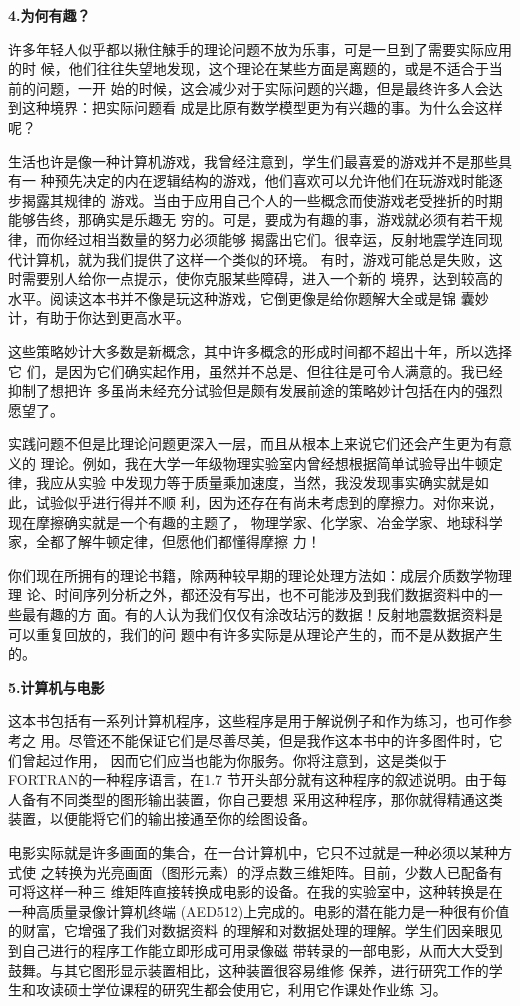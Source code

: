 \textbf{4.为何有趣？}


许多年轻人似乎都以揪住觫手的理论问题不放为乐事，可是一旦到了需要实际应用的时
候，他们往往失望地发现，这个理论在某些方面是离题的，或是不适合于当前的问题，一开
始的时候，这会减少对于实际问题的兴趣，但是最终许多人会达到这种境界：把实际问题看
成是比原有数学模型更为有兴趣的事。为什么会这样呢？

生活也许是像一种计算机游戏，我曾经注意到，学生们最喜爱的游戏并不是那些具有一
种预先决定的内在逻辑结构的游戏，他们喜欢可以允许他们在玩游戏时能逐步揭露其规律的
游戏。当由于应用自己个人的一些概念而使游戏老受挫折的时期能够告终，那确实是乐趣无
穷的。可是，要成为有趣的事，游戏就必须有若干规律，而你经过相当数量的努力必须能够
揭露出它们。很幸运，反射地震学连同现代计算机，就为我们提供了这样一个类似的环境。
有时，游戏可能总是失败，这时需要别人给你一点提示，使你克服某些障碍，进入一个新的
境界，达到较高的水平。阅读这本书并不像是玩这种游戏，它倒更像是给你题解大全或是锦
囊妙计，有助于你达到更高水平。

这些策略妙计大多数是新概念，其中许多概念的形成时间都不超出十年，所以选择它
们，是因为它们确实起作用，虽然并不总是、但往往是可令人满意的。我已经抑制了想把许
多虽尚未经充分试验但是颇有发展前途的策略妙计包括在内的强烈愿望了。

实践问题不但是比理论问题更深入一层，而且从根本上来说它们还会产生更为有意义的
理论。例如，我在大学一年级物理实验室内曾经想根据简单试验导出牛顿定律，我应从实验
中发现力等于质量乘加速度，当然，我没发现事实确实就是如此，试验似乎进行得并不顺
利，因为还存在有尚未考虑到的摩擦力。对你来说，现在摩擦确实就是一个有趣的主题了，
物理学家、化学家、冶金学家、地球科学家，全都了解牛顿定律，但愿他们都懂得摩擦
力！

你们现在所拥有的理论书籍，除两种较早期的理论处理方法如：成层介质数学物理理
论、时间序列分析之外，都还没有写出，也不可能涉及到我们数据资料中的一些最有趣的方
面。有的人认为我们仅仅有涂改玷污的数据！反射地震数据资料是可以重复回放的，我们的问
题中有许多实际是从理论产生的，而不是从数据产生的。


\textbf{5.计算机与电影}


这本书包括有一系列计算机程序，这些程序是用于解说例子和作为练习，也可作参考之
用。尽管还不能保证它们是尽善尽美，但是我作这本书中的许多图件时，它们曾起过作用，
因而它们应当也能为你服务。你将注意到，这是类似于FORTRAN的一种程序语言，在1.7
节开头部分就有这种程序的叙述说明。由于每人备有不同类型的图形输出装置，你自己要想
采用这种程序，那你就得精通这类装置，以便能将它们的输出接通至你的绘图设备。

电影实际就是许多画面的集合，在一台计算机中，它只不过就是一种必须以某种方式使
之转换为光亮画面（图形元素）的浮点数三维矩阵。目前，少数人已配备有可将这样一种三
维矩阵直接转换成电影的设备。在我的实验室中，这种转换是在一种高质量录像计算机终端
(AED512)上完成的。电影的潜在能力是一种很有价值的财富，它增强了我们对数据资料
的理解和对数据处理的理解。学生们因亲眼见到自己进行的程序工作能立即形成可用录像磁
带转录的一部电影，从而大大受到鼓舞。与其它图形显示装置相比，这种装置很容易维修
保养，进行研究工作的学生和攻读硕士学位课程的研究生都会使用它，利用它作课处作业练
习。


